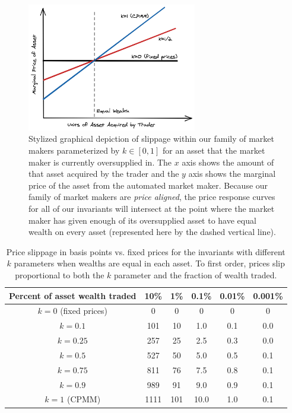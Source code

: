 \documentclass[11pt]{article}
\begin{document}
\begin{figure}[t]
\begin{center}
\includegraphics[width=0.66\textwidth]{AssetsAcquired}
\caption{Stylized graphical depiction of slippage within our family of market makers parameterized by $k \in [0,1]$ for an asset that the market maker is currently oversupplied in. The $x$ axis shows the amount of that asset acquired by the trader and the $y$ axis shows the marginal price of the asset from the automated market maker. Because our family of market makers are \emph{price aligned}, the price response curves for all of our invariants will intersect at the point where the market maker has given enough of its oversupplied asset to have equal wealth on every asset (represented here by the dashed vertical line).
}
\label{fig:assetsacquired}
\end{center}
\end{figure}


\begin{table}[htbp]
\begin{center}
\begin{tabular}{|c|c|c|c|c|c|}
\hline
Percent of asset wealth traded &  10\% & 1\% & 0.1\% & 0.01\% & 0.001\% \\
\hline
$k=0$ (fixed prices) & 0 & 0 & 0 & 0 & 0 \\
$k=0.1$ & 101 & 10 & 1.0 & 0.1 & 0.0 \\
$k=0.25$ & 257 & 25 & 2.5 & 0.3 & 0.0 \\
$k=0.5$ & 527 & 50 & 5.0 & 0.5 & 0.1 \\
$k=0.75$ & 811 & 76 & 7.5 & 0.8 & 0.1 \\
$k=0.9$ & 989 & 91 & 9.0 & 0.9 & 0.1 \\
$k=1$ (CPMM) & 1111 & 101 & 10.0 & 1.0 & 0.1 \\
\hline
\end{tabular}
\caption{Price slippage in basis points vs. fixed prices for the invariants with different $k$ parameters when wealths are equal in each asset. To first order, prices slip proportional to both the $k$ parameter and the fraction of wealth traded.}

\end{center}
\label{tab:slipps}
\end{table}%
\end{document}
